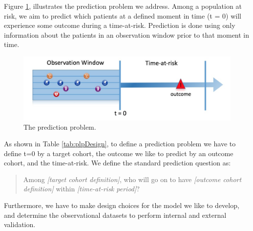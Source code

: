 \documentclass[11pt]{book}
\theoremstyle{definition}
\theoremstyle{definition}
\theoremstyle{definition}
\theoremstyle{remark}
\begin{document}
Figure \ref{fig:figure1}, illustrates the prediction problem we address. Among a population at risk, we aim to predict which patients at a defined moment in time (t = 0) will experience some outcome during a time-at-risk. Prediction is done using only information about the patients in an observation window prior to that moment in time.

\begin{figure}
\includegraphics[width=1\linewidth]{images/PatientLevelPrediction/Figure1} \caption{The prediction problem.}\label{fig:figure1}
\end{figure}

As shown in Table \ref{tab:plpDesign}, to define a prediction problem we have to define t=0 by a target cohort, the outcome we like to predict by an outcome cohort, and the time-at-risk. We define the standard prediction question as:

\begin{quote}
Among \emph{{[}target cohort definition{]}}, who will go on to have \emph{{[}outcome cohort definition{]}} within \emph{{[}time-at-risk period{]}}?
\end{quote}

Furthermore, we have to make design choices for the model we like to develop, and determine the observational datasets to perform internal and external validation.
\end{document}
